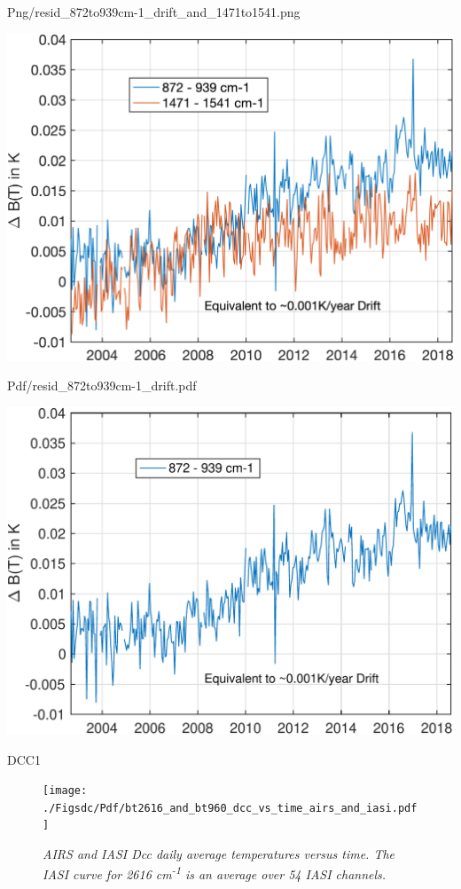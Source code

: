\documentclass[presentation]{beamer}
\begin{document}
\begin{frame}[label={sec:org82970e8}]{Png/resid\_872to939cm-1\_drift\_and\_1471to1541.png}
\begin{center}
\includegraphics[width=0.7\linewidth]{./Figs/Png/resid_872to939cm-1_drift_and_1471to1541.png}
\end{center}
\end{frame}

\begin{frame}[label={sec:org0a0dc42}]{Pdf/resid\_872to939cm-1\_drift.pdf}
\begin{center}
\includegraphics[width=0.7\linewidth]{./Figs/Pdf/resid_872to939cm-1_drift.pdf}
\end{center}
\end{frame}


\begin{frame}[label={sec:org41edc10}]{DCC1}
\begin{figure}[htbp]
\centering
\texttt{[image: ./Figsdc/Pdf/bt2616\_and\_bt960\_dcc\_vs\_time\_airs\_and\_iasi.pdf]}
\caption{\emph{AIRS and IASI Dcc daily average temperatures versus time.  The IASI curve for 2616 cm\textsuperscript{-1} is an average over 54 IASI channels.}}
\end{figure}
\end{frame}
\end{document}
